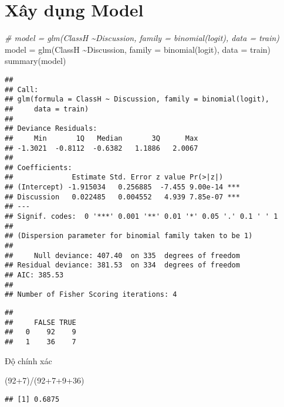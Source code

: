 \documentclass[
]{article}
\newenvironment{Shaded}{\begin{snugshade}}{\end{snugshade}}
\newcommand{\AttributeTok}[1]{\textcolor[rgb]{0.77,0.63,0.00}{#1}}
\newcommand{\CommentTok}[1]{\textcolor[rgb]{0.56,0.35,0.01}{\textit{#1}}}
\newcommand{\DecValTok}[1]{\textcolor[rgb]{0.00,0.00,0.81}{#1}}
\newcommand{\FloatTok}[1]{\textcolor[rgb]{0.00,0.00,0.81}{#1}}
\newcommand{\FunctionTok}[1]{\textcolor[rgb]{0.00,0.00,0.00}{#1}}
\newcommand{\NormalTok}[1]{#1}
\newcommand{\OtherTok}[1]{\textcolor[rgb]{0.56,0.35,0.01}{#1}}
\newcommand{\SpecialCharTok}[1]{\textcolor[rgb]{0.00,0.00,0.00}{#1}}
\newcommand{\StringTok}[1]{\textcolor[rgb]{0.31,0.60,0.02}{#1}}
\begin{document}
\hypertarget{xuxe2y-dux1ee5ng-model}{%
\section{Xây dụng Model}\label{xuxe2y-dux1ee5ng-model}}

\begin{Shaded}
\begin{Highlighting}[]
\CommentTok{\# model = glm(ClassH \textasciitilde{}Discussion, family = binomial(logit), data = train)}
\NormalTok{model }\OtherTok{=} \FunctionTok{glm}\NormalTok{(ClassH }\SpecialCharTok{\textasciitilde{}}\NormalTok{Discussion, }\AttributeTok{family =} \FunctionTok{binomial}\NormalTok{(logit), }\AttributeTok{data =}\NormalTok{ train)}
\FunctionTok{summary}\NormalTok{(model)}
\end{Highlighting}
\end{Shaded}

\begin{verbatim}
## 
## Call:
## glm(formula = ClassH ~ Discussion, family = binomial(logit), 
##     data = train)
## 
## Deviance Residuals: 
##     Min       1Q   Median       3Q      Max  
## -1.3021  -0.8112  -0.6382   1.1886   2.0067  
## 
## Coefficients:
##              Estimate Std. Error z value Pr(>|z|)    
## (Intercept) -1.915034   0.256885  -7.455 9.00e-14 ***
## Discussion   0.022485   0.004552   4.939 7.85e-07 ***
## ---
## Signif. codes:  0 '***' 0.001 '**' 0.01 '*' 0.05 '.' 0.1 ' ' 1
## 
## (Dispersion parameter for binomial family taken to be 1)
## 
##     Null deviance: 407.40  on 335  degrees of freedom
## Residual deviance: 381.53  on 334  degrees of freedom
## AIC: 385.53
## 
## Number of Fisher Scoring iterations: 4
\end{verbatim}

\begin{Shaded}
\end{Shaded}

\begin{verbatim}
##    
##     FALSE TRUE
##   0    92    9
##   1    36    7
\end{verbatim}

Độ chính xác

\begin{Shaded}
\begin{Highlighting}[]
\NormalTok{(}\DecValTok{92}\SpecialCharTok{+}\DecValTok{7}\NormalTok{)}\SpecialCharTok{/}\NormalTok{(}\DecValTok{92}\SpecialCharTok{+}\DecValTok{7}\SpecialCharTok{+}\DecValTok{9}\SpecialCharTok{+}\DecValTok{36}\NormalTok{)}
\end{Highlighting}
\end{Shaded}

\begin{verbatim}
## [1] 0.6875
\end{verbatim}
\end{document}
